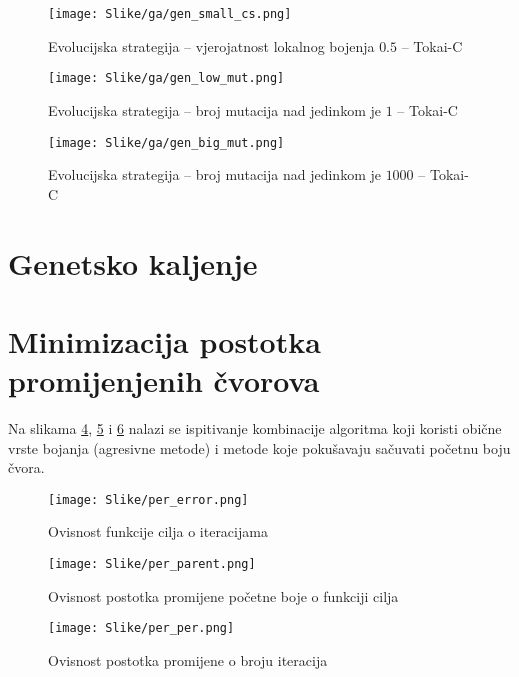 \documentclass[times, utf8, diplomski, numeric]{fer}
\begin{document}
\begin{figure}[htb]
	\texttt{[image: Slike/ga/gen\_small\_cs.png]}
	\caption{Evolucijska strategija -- vjerojatnost lokalnog bojenja $0.5$ -- Tokai-C}
	\label{fig:gen_small_cs}
\end{figure}

\begin{figure}[htb]
	\texttt{[image: Slike/ga/gen\_low\_mut.png]}
	\caption{Evolucijska strategija -- broj mutacija nad jedinkom je $1$ -- Tokai-C}
	\label{fig:gen_low_mut}
\end{figure}

\begin{figure}[htb]
	\texttt{[image: Slike/ga/gen\_big\_mut.png]}
	\caption{Evolucijska strategija -- broj mutacija nad jedinkom je $1000$ -- Tokai-C}
	\label{fig:gen_big_mut}
\end{figure}

\clearpage

\section{Genetsko kaljenje}



\section{Minimizacija postotka promijenjenih čvorova}

Na slikama \ref{fig:per_error}, \ref{fig:per_parent} i \ref{fig:per_per} nalazi se ispitivanje kombinacije algoritma koji koristi obične vrste bojanja (agresivne metode) i metode koje pokušavaju sačuvati početnu boju čvora.

\begin{figure}[htb]
	\texttt{[image: Slike/per\_error.png]}
  \caption{Ovisnost funkcije cilja o iteracijama}
  \label{fig:per_error}
\end{figure}

\begin{figure}[htb]
	\texttt{[image: Slike/per\_parent.png]}
  \caption{Ovisnost postotka promijene početne boje o funkciji cilja}
	\label{fig:per_parent}
\end{figure}

\begin{figure}[htb]
	\texttt{[image: Slike/per\_per.png]}
	\caption{Ovisnost postotka promijene o broju iteracija}
	\label{fig:per_per}
\end{figure}
\end{document}
